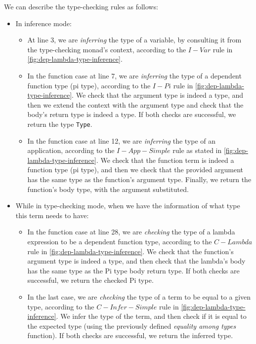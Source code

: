 \documentclass[12pt]{article}
\theoremstyle{definition}
\newcommand{\code}[1]{\texttt{#1}}
\begin{document}
We can describe the type-checking rules as follows:
\begin{itemize}
       \item In inference mode:
              \begin{itemize}
                     \item At line 3, we are \emph{inferring} the type of a variable, by consulting it from the type-checking monad's context, according to the $I-Var$ rule in \autoref{fig:dep-lambda-type-inference}.
                     \item In the function case at line 7, we are \emph{inferring} the type of a dependent function type (pi type), according to the $I-Pi$ rule in \autoref{fig:dep-lambda-type-inference}. We check that the argument type is indeed a type, and then we extend the context with the argument type and check that the body's return type is indeed a type. If both checks are successful, we return the type \code{Type}.
                     \item In the function case at line 12, we are \emph{inferring} the type of an application, according to the $I-App-Simple$ rule as stated in \autoref{fig:dep-lambda-type-inference}. We check that the function term is indeed a function type (pi type), and then we check that the provided argument has the same type as the function's argument type. Finally, we return the function's body type, with the argument substituted.
              \end{itemize}
       \item While in type-checking mode, when we have the information of what type this term needs to have:
              \begin{itemize}
                     \item In the function case at line 28, we are \emph{checking} the type of a lambda expression to be a dependent function type, according to the $C-Lambda$ rule in \autoref{fig:dep-lambda-type-inference}. We check that the function's argument type is indeed a type, and then check that the lambda's body has the same type as the Pi type body return type. If both checks are successful, we return the checked Pi type.
                     \item In the last case, we are \emph{checking} the type of a term to be equal to a given type, according to the $C-Infer-Simple$ rule in \autoref{fig:dep-lambda-type-inference}. We infer the type of the term, and then check if it is equal to the expected type (using the previously defined \emph{equality among types} function). If both checks are successful, we return the inferred type.
              \end{itemize}
\end{itemize}
\end{document}
